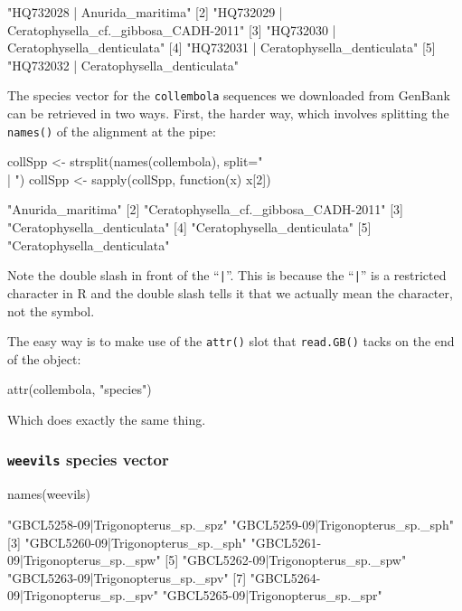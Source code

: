 \documentclass{article}
\newcommand{\progname}[1]{\textsc{#1}}
\newcommand{\fun}[1]{\texttt{#1}}
\begin{document}
\begin{Routput}
 [1] "HQ732028 | Anurida_maritima"                    
 [2] "HQ732029 | Ceratophysella_cf._gibbosa_CADH-2011"
 [3] "HQ732030 | Ceratophysella_denticulata"          
 [4] "HQ732031 | Ceratophysella_denticulata"          
 [5] "HQ732032 | Ceratophysella_denticulata" 
\end{Routput}

The species vector for the \fun{collembola} sequences we downloaded from GenBank can be retrieved in two ways. First, the harder way, which involves splitting the \fun{names()} of the alignment at the pipe:

\begin{console}
collSpp <- strsplit(names(collembola), split=" \\| ")
collSpp <- sapply(collSpp, function(x) x[2])
\end{console}

\begin{Routput}
 [1] "Anurida_maritima"                    
 [2] "Ceratophysella_cf._gibbosa_CADH-2011"
 [3] "Ceratophysella_denticulata"          
 [4] "Ceratophysella_denticulata"          
 [5] "Ceratophysella_denticulata" 
\end{Routput}

Note the double slash in front of the ``\verb+|+''. This is because the ``\verb+|+'' is a restricted character in \progname{R} and the double slash tells it that we actually mean the character, not the symbol.

The easy way is to make use of the \fun{attr()} slot that \fun{read.GB()} tacks on the end of the object:

\begin{console}
attr(collembola, "species")
\end{console}

Which does exactly the same thing. 

\subsubsection{\fun{weevils} species vector}

\begin{console}
names(weevils)
\end{console}

\begin{Routput}
  [1] "GBCL5258-09|Trigonopterus_sp._spz"  "GBCL5259-09|Trigonopterus_sp._sph" 
  [3] "GBCL5260-09|Trigonopterus_sp._sph"  "GBCL5261-09|Trigonopterus_sp._spw" 
  [5] "GBCL5262-09|Trigonopterus_sp._spw"  "GBCL5263-09|Trigonopterus_sp._spv" 
  [7] "GBCL5264-09|Trigonopterus_sp._spv"  "GBCL5265-09|Trigonopterus_sp._spr"
\end{Routput}
\end{document}
